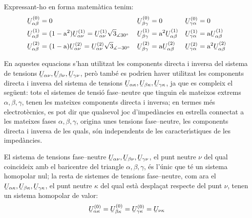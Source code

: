 Expressant-ho en forma matem\`{a}tica tenim:
\begin{subequations}
\begin{align}
   \cmplx{U}_{\alpha\beta}\ap{(0)} &= 0 &
   \cmplx{U}_{\beta\gamma}\ap{(0)} &= 0 &
   \cmplx{U}_{\gamma\alpha}\ap{(0)} &= 0 \\
   \cmplx{U}_{\alpha\beta}\ap{(1)} &= (1-\au^2) \cmplx{U}_{\alpha\nu}\ap{(1)} =
   \cmplx{U}_{\alpha\nu}\ap{(1)} \sqrt{3}_{\measuredangle 30\degree} &
   \cmplx{U}_{\beta\gamma}\ap{(1)} &= \au^2 \cmplx{U}_{\alpha\beta}\ap{(1)} &
   \cmplx{U}_{\gamma\alpha}\ap{(1)} &= \au \cmplx{U}_{\alpha\beta}\ap{(1)} \label{eq:c_sim_a3} \\
   \cmplx{U}_{\alpha\beta}\ap{(2)} &= (1-\au) \cmplx{U}_{\alpha\nu}\ap{(2)}  =
   \cmplx{U}_{\alpha\nu}\ap{(2)} \sqrt{3}_{\measuredangle -30\degree}&
   \cmplx{U}_{\beta\gamma}\ap{(2)} &= \au \cmplx{U}_{\alpha\beta}\ap{(2)} &
   \cmplx{U}_{\gamma\alpha}\ap{(2)} &= \au^2 \cmplx{U}_{\alpha\beta}\ap{(2)} \label{eq:c_sim_b3}
\end{align}
\end{subequations}

En aquestes equacions s'han utilitzat les components directa i
inversa del sistema de tensions
$\cmplx{U}_{\alpha\nu},\cmplx{U}_{\beta\nu},\cmplx{U}_{\gamma\nu}$,
per\`{o} tamb\'{e} es podrien haver utilitzat les components directa i
inversa del sistema de tensions
$\cmplx{U}_{\alpha\kappa},\cmplx{U}_{\beta\kappa},\cmplx{U}_{\gamma\kappa}$,
ja que es compleix el seg\"{u}ent: tots el sistemes de tensi\'{o}
fase--neutre que tinguin els mateixos extrems $\alpha, \beta,
\gamma$, tenen les mateixes components directa i inversa; en termes
m\'{e}s electrot\`{e}cnics, es pot dir que qualsevol joc d'imped\`{a}ncies en
estrella connectat a les mateixes fases $\alpha, \beta, \gamma$,
origina unes tensions fase--neutre, les components directa i inversa
de les quals, s\'{o}n independents de les caracter\'{\i}stiques de les
imped\`{a}ncies.

El sistema de tensions fase--neutre
$\cmplx{U}_{\alpha\nu},\cmplx{U}_{\beta\nu},\cmplx{U}_{\gamma\nu}$,
el punt neutre $\nu$ del qual coincideix amb el baricentre del
triangle $\alpha, \beta,
 \gamma$, \'{e}s l'\'{u}nic que t\'{e} un sistema homopolar nul; la resta de sistemes de tensions
 fase--neutre, com ara el $\cmplx{U}_{\alpha\kappa},\cmplx{U}_{\beta\kappa},\cmplx{U}_{\gamma\kappa}$,
 el punt neutre $\kappa$ del qual est\`{a} despla\c{c}at respecte del punt $\nu$, tenen un sistema
 homopolar de valor:
\begin{equation}
    \cmplx{U}_{\alpha\kappa}\ap{(0)} = \cmplx{U}_{\beta\kappa}\ap{(0)} =
    \cmplx{U}_{\gamma\kappa}\ap{(0)} = \cmplx{U}_{\nu\kappa}
\end{equation}

